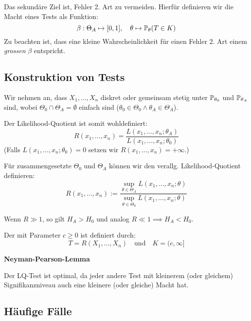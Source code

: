 Das sekundäre Ziel ist, Fehler 2. Art zu vermeiden. Hierfür definieren wir die Macht eines Tests als Funktion:
\[\beta : \Theta_A \mapsto [0,1], \quad \theta \mapsto \P_\theta(T \in K)\]
Zu beachten ist, dass eine kleine Wahrscheinlichkeit für einen Fehler 2. Art einem \textit{grossen} \(\beta\) entspricht.

\subsection{Konstruktion von Tests}
Wir nehmen an, dass \(X_1, \ldots, X_n\) diskret oder gemeinsam stetig unter \(\P_{\theta_0}\) und \(\P_{\theta_A}\) sind, wobei \(\Theta_0 \cap \Theta_A = \emptyset\) einfach sind (\(\theta_0 \in \Theta_0 \land \theta_A \in \Theta_A\)).

\noindent Der Likelihood-Quotient ist somit wohldefiniert:
\[R(x_1, \ldots, x_n) = \frac{L(x_1,\ldots, x_n;\theta_A)}{L(x_1, \ldots, x_n;\theta_0)}\]
(Falls \(L(x_1, \ldots, x_n; \theta_0) = 0\) setzen wir \(R(x_1, \ldots, x_n) = +\infty\).) 

Für zusammengesetzte $\Theta_0$ und $\Theta_A$ können wir den verallg. Likelihood-Quotient definieren:
\[R(x_1, ..., x_n) := \frac{\sup_{\theta \in \Theta_A}L(x_1, \dots, x_n; \theta)}{\sup_{\theta \in \Theta_0}L(x_1, \dots, x_n; \theta)}\]


Wenn \(R \gg 1\), so gilt \(H_A > H_0\) und analog \(R \ll 1 \implies H_A < H_0\).

\begin{subbox}{}
	Der  mit Parameter \(c \ge 0\) ist definiert durch:
	\[T = R(X_1, \ldots, X_n) \quad \text{und} \quad K = (c, \infty]\]
\end{subbox}
\textbf{Neyman-Pearson-Lemma}

Der LQ-Test ist optimal, da jeder andere Test mit kleinerem (oder gleichem) Signifikanzniveau auch eine kleinere (oder gleiche) Macht hat.

\subsection{Häufige Fälle}
